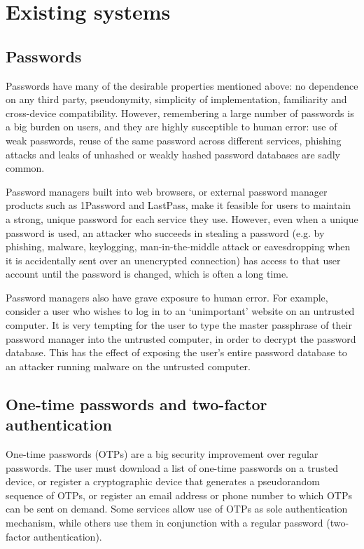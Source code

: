 \section{Existing systems}
\subsection{Passwords}

Passwords have many of the desirable properties mentioned above: no dependence on any third party,
pseudonymity, simplicity of implementation, familiarity and cross-device compatibility. However,
remembering a large number of passwords is a big burden on users, and they are highly susceptible to
human error: use of weak passwords, reuse of the same password across different services, phishing
attacks and leaks of unhashed or weakly hashed password databases are sadly common.

Password managers built into web browsers, or external password manager products such as 1Password
and LastPass, make it feasible for users to maintain a strong, unique password for each service they
use. However, even when a unique password is used, an attacker who succeeds in stealing a password
(e.g. by phishing, malware, keylogging, man-in-the-middle attack or eavesdropping when it is
accidentally sent over an unencrypted connection) has access to that user account until the password
is changed, which is often a long time.

Password managers also have grave exposure to human error. For example, consider a user who wishes
to log in to an `unimportant' website on an untrusted computer. It is very tempting for the user to
type the master passphrase of their password manager into the untrusted computer, in order to
decrypt the password database. This has the effect of exposing the user's entire password database
to an attacker running malware on the untrusted computer.

\subsection{One-time passwords and two-factor authentication}

One-time passwords (OTPs) are a big security improvement over regular passwords. The user must
download a list of one-time passwords on a trusted device, or register a cryptographic device that
generates a pseudorandom sequence of OTPs, or register an email address or phone number to which
OTPs can be sent on demand. Some services allow use of OTPs as sole authentication mechanism, while
others use them in conjunction with a regular password (two-factor authentication).

